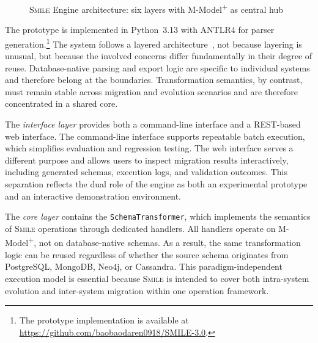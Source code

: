 \documentclass{llncs}
\begin{document}
\begin{figure}[htbp]
  \caption{\textsc{Smile} Engine architecture: six layers with M-Model\textsuperscript{+} as central hub}
  \label{fig:system-architecture}
\end{figure}




The prototype is implemented in Python~3.13 with ANTLR4 for parser generation.\footnote{The prototype implementation is available at \url{https://github.com/baobaodaren0918/SMILE-3.0}.}
The system follows a layered architecture~\cite{richards2020fundamentals}, not because layering is unusual, but because the involved concerns differ fundamentally in their degree of reuse.
Database-native parsing and export logic are specific to individual systems and therefore belong at the boundaries.
Transformation semantics, by contrast, must remain stable across migration and evolution scenarios and are therefore concentrated in a shared core.

The \emph{interface layer} provides both a command-line interface and a REST-based web interface.
The command-line interface supports repeatable batch execution, which simplifies evaluation and regression testing.
The web interface serves a different purpose and allows users to inspect migration results interactively, including generated schemas, execution logs, and validation outcomes.
This separation reflects the dual role of the engine as both an experimental prototype and an interactive demonstration environment.

The \emph{core layer} contains the \texttt{SchemaTransformer}, which implements the semantics of \textsc{Smile} operations through dedicated handlers.
All handlers operate on M-Model\textsuperscript{+}, not on database-native schemas.
As a result, the same transformation logic can be reused regardless of whether the source schema originates from PostgreSQL, MongoDB, Neo4j, or Cassandra.
This paradigm-independent execution model is essential because \textsc{Smile} is intended to cover both intra-system evolution and inter-system migration within one operation framework.
\end{document}
